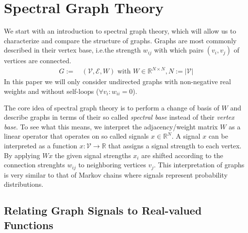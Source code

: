 \section{Spectral Graph Theory}%
\label{sec:sgt}

We start with an introduction to spectral graph theory, which will allow us to characterize and compare the structure of graphs.
Graphs are most commonly described in their vertex base, i.e.\@ the strength $w_{i j}$ with which pairs $(v_i, v_j)$ of vertices are connected.
\begin{align*}
	G :=&\, (\mathcal{V}, \mathcal{E}, W) \text{ with } W \in \mathbb{R}^{N \times N}, N := |\mathcal{V}|
\end{align*}
In this paper we will only consider undirected graphs with non-negative real weights and without self-loops ($\forall v_i: w_{i i} = 0$).

The core idea of spectral graph theory is to perform a change of basis of $W$ and describe graphs in terms of their so called \textit{spectral base} instead of their \textit{vertex base}.
To see what this means, we interpret the adjacency/weight matrix $W$ as a linear operator that operates on so called signals $x \in \mathbb{R}^N$.
A signal $x$ can be interpreted as a function $x: \mathcal{V} \to \mathbb{R}$ that assigns a signal strength to each vertex.
By applying $Wx$ the given signal strengths $x_i$ are shifted according to the connection strenghts $w_{i j}$ to neighboring vertices $v_j$.
This interpretation of graphs is very similar to that of Markov chains where signals represent probability distributions.

\subsection{Relating Graph Signals to Real-valued Functions}%
\label{sec:sgt:real}

